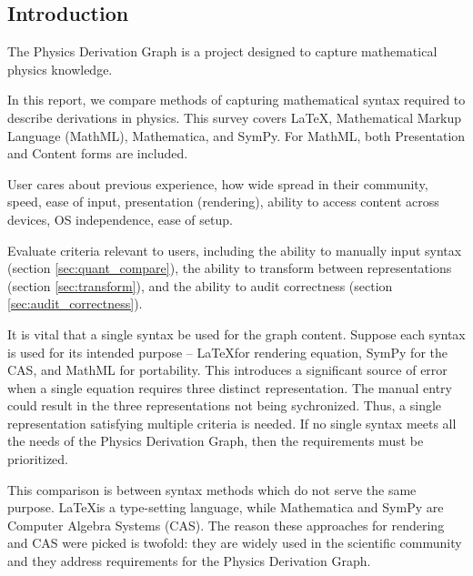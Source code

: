 \documentclass{article}
\begin{document}
\begin{multicols}{2}





\section{Introduction}

The Physics Derivation Graph is a project designed to capture mathematical physics knowledge. 


In this report, we compare methods of capturing mathematical syntax required to describe derivations in physics. This survey covers \LaTeX, Mathematical Markup Language (MathML)\cite{2014_MathML}, Mathematica\cite{2014_mathematica}, and SymPy\cite{2014_SymPy}. For MathML, both Presentation and Content forms are included.

User cares about previous experience, how wide spread in their community, speed, ease of input, presentation (rendering), ability to access content across devices, OS independence, ease of setup. 

Evaluate criteria relevant to users, including the ability to manually input syntax (section \ref{sec:quant_compare}), the ability to transform between representations (section \ref{sec:transform}), and the ability to audit correctness (section \ref{sec:audit_correctness}).

It is vital that a single syntax be used for the graph content. Suppose each syntax is used for its intended purpose -- \LaTeX for rendering equation, SymPy for the CAS, and MathML for portability. This introduces a significant source of error when a single equation requires three distinct representation. The manual entry could result in the three representations not being sychronized. Thus, a single representation satisfying multiple criteria is needed. If no single syntax meets all the needs of the Physics Derivation Graph, then the requirements must be prioritized.

This comparison is between syntax methods which do not serve the same purpose. \LaTeX is a type-setting language, while Mathematica and SymPy are Computer Algebra Systems (CAS). The reason these approaches for rendering and CAS were picked is twofold: they are widely used in the scientific community and they address requirements for the Physics Derivation Graph. 


\end{multicols}
\end{document}
